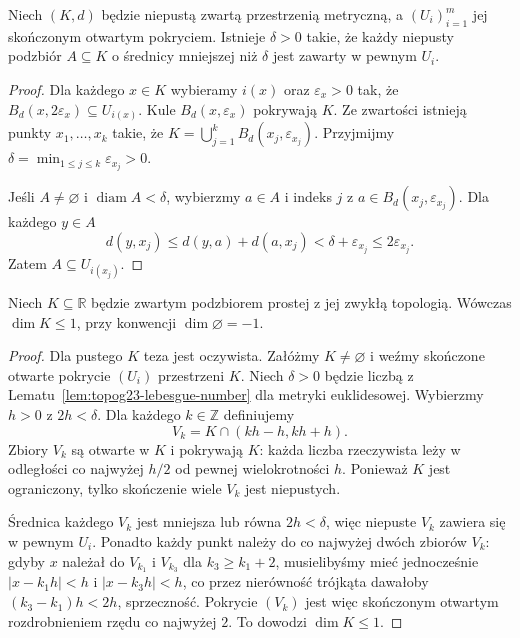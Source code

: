 \begin{lemat}
\label{lem:topog23-lebesgue-number}
Niech \((K,d)\) będzie niepustą
zwartą przestrzenią metryczną,
a \((U_i)_{i=1}^m\) jej skończonym
otwartym pokryciem.
Istnieje \(\delta>0\) takie,
że każdy niepusty podzbiór \(A\subseteq K\)
o średnicy mniejszej niż \(\delta\)
jest zawarty w pewnym \(U_i\).
\end{lemat}
\begin{proof}
Dla każdego \(x\in K\) wybieramy \(i(x)\)
oraz \(\varepsilon_x>0\) tak, że
\(B_d(x,2\varepsilon_x)\subseteq U_{i(x)}\).
Kule \(B_d(x,\varepsilon_x)\) pokrywają \(K\).
Ze zwartości istnieją punkty
\(x_1,\ldots,x_k\) takie, że
\(K=\bigcup_{j=1}^k B_d(x_j,\varepsilon_{x_j})\).
Przyjmijmy
\(\delta=\min_{1\le j\le k}\varepsilon_{x_j}>0\).

Jeśli \(A\neq\varnothing\) i
\(\operatorname{diam} A<\delta\),
wybierzmy \(a\in A\) i indeks \(j\)
z \(a\in B_d(x_j,\varepsilon_{x_j})\).
Dla każdego \(y\in A\)
\[
 d(y,x_j)\le d(y,a)+d(a,x_j)
 <\delta+\varepsilon_{x_j}
 \le2\varepsilon_{x_j}.
\]
Zatem \(A\subseteq U_{i(x_j)}\).
\end{proof}

\begin{twierdzenie}
\label{thm:topog23-real-upper}
Niech \(K\subseteq\mathbb R\) będzie zwartym
podzbiorem prostej z jej zwykłą topologią.
Wówczas \(\dim K\le1\),
przy konwencji \(\dim\varnothing=-1\).
\end{twierdzenie}
\begin{proof}
Dla pustego \(K\) teza jest oczywista.
Załóżmy \(K\neq\varnothing\)
i weźmy skończone otwarte pokrycie \((U_i)\)
przestrzeni \(K\).
Niech \(\delta>0\) będzie liczbą
z Lematu~\ref{lem:topog23-lebesgue-number}
dla metryki euklidesowej.
Wybierzmy \(h>0\) z \(2h<\delta\).
Dla każdego \(k\in\mathbb Z\) definiujemy
\[
 V_k=K\cap(kh-h,kh+h).
\]
Zbiory \(V_k\) są otwarte w \(K\) i pokrywają \(K\):
każda liczba rzeczywista leży w odległości
co najwyżej \(h/2\) od pewnej wielokrotności \(h\).
Ponieważ \(K\) jest ograniczony,
tylko skończenie wiele \(V_k\)
jest niepustych.

Średnica każdego \(V_k\)
jest mniejsza lub równa \(2h<\delta\),
więc niepuste \(V_k\) zawiera się w pewnym \(U_i\).
Ponadto każdy punkt należy
do co najwyżej dwóch zbiorów \(V_k\):
gdyby \(x\) należał do \(V_{k_1}\)
i \(V_{k_3}\) dla \(k_3\ge k_1+2\),
musielibyśmy mieć jednocześnie
\(|x-k_1h|<h\) i
\(|x-k_3h|<h\), co przez nierówność trójkąta
dawałoby \((k_3-k_1)h<2h\),
sprzeczność.
Pokrycie \((V_k)\) jest więc
skończonym otwartym rozdrobnieniem
rzędu co najwyżej \(2\).
To dowodzi \(\dim K\le1\).
\end{proof}

